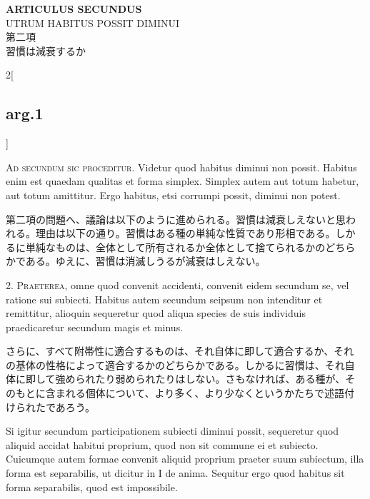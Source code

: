 \documentclass[paper=a4paper,fontsize=10pt,jafontsize=9pt,titlepage]{jlreq}
\begin{document}
\newpage
{}
{}
\setcounter{section}{2}
\setcounter{subsection}{0}




\begin{center}
{\Large {\bfseries ARTICULUS SECUNDUS}}\\ {\large UTRUM HABITUS POSSIT
DIMINUI}\\ {\Large 第二項\\習慣は減衰するか}
\end{center}

\begin{paracol}{2}[\subsection{arg.1}]

{\scshape Ad secundum sic proceditur}. Videtur quod habitus diminui
non possit. Habitus enim est quaedam qualitas et forma
simplex. Simplex autem aut totum habetur, aut totum amittitur. Ergo
habitus, etsi corrumpi possit, diminui non potest.

\switchcolumn

第二項の問題へ、議論は以下のように進められる。習慣は減衰しえないと思わ
れる。理由は以下の通り。習慣はある種の単純な性質であり形相である。しか
るに単純なものは、全体として所有されるか全体として捨てられるかのどちら
かである。ゆえに、習慣は消滅しうるが減衰はしえない。


2. {\scshape Praeterea}, omne quod convenit accidenti, convenit eidem
secundum se, vel ratione sui subiecti. Habitus autem secundum seipsum
non intenditur et remittitur, alioquin sequeretur quod aliqua species
de suis individuis praedicaretur secundum magis et minus.

\switchcolumn

さらに、すべて附帯性に適合するものは、それ自体に即して適合するか、それ
の基体の性格によって適合するかのどちらかである。しかるに習慣は、それ自
体に即して強められたり弱められたりはしない。さもなければ、ある種が、そ
のもとに含まれる個体について、より多く、より少なくというかたちで述語付
けられたであろう。

\switchcolumn*

Si igitur secundum participationem subiecti diminui possit, sequeretur
quod aliquid accidat habitui proprium, quod non sit commune ei et
subiecto. Cuicumque autem formae convenit aliquid proprium praeter
suum subiectum, illa forma est separabilis, ut dicitur in I de
anima. Sequitur ergo quod habitus sit forma separabilis, quod est
impossibile.


\end{paracol}
\end{document}
